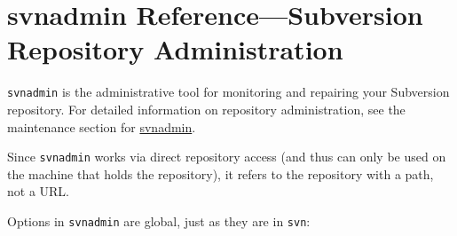 \chapter{svnadmin Reference---Subversion Repository
Administration}\label{svn.ref.svnadmin}

\texttt{svnadmin} is the administrative tool for monitoring and
repairing your Subversion repository. For detailed information on
repository administration, see the maintenance section for
\hyperref[svn.reposadmin.maint.tk.svnadmin]{svnadmin}.

Since \texttt{svnadmin} works via direct repository access (and thus can
only be used on the machine that holds the repository), it refers to the
repository with a path, not a URL.

Options in \texttt{svnadmin} are global, just as they are in
\texttt{svn}:

\protect{}\label{svn.ref.svnadmin.sw}{}

